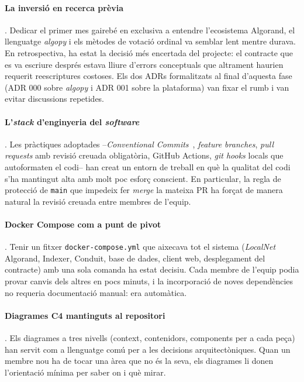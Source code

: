 \paragraph{La inversió en recerca prèvia}.
Dedicar el primer mes gairebé en exclusiva a entendre l'ecosistema Algorand, el llenguatge \emph{algopy} i els mètodes
de votació ordinal va semblar lent mentre durava.
En retrospectiva, ha estat la decisió més encertada del projecte: el contracte que es va escriure després estava lliure
d'errors conceptuals que altrament haurien requerit reescriptures costoses.
Els dos \acp{ADR} formalitzats al final d'aquesta fase (\acl{ADR} 000 sobre \emph{algopy} i \acl{ADR} 001 sobre la
plataforma) van fixar el rumb i van evitar discussions repetides.

\paragraph{L'\emph{stack} d'enginyeria del \textit{software}}.
Les pràctiques adoptades --\emph{Conventional Commits}~\cite{conventionalcommits}, \emph{feature branches},
\emph{pull requests} amb revisió creuada obligatòria, GitHub Actions, \emph{git hooks} locals que autoformaten el
codi-- han creat un entorn de treball en què la qualitat del codi s'ha mantingut alta amb molt poc esforç conscient.
En particular, la regla de protecció de \texttt{main} que impedeix fer \emph{merge} la mateixa \ac{PR} ha forçat de
manera natural la revisió creuada entre membres de l'equip.

\paragraph{Docker Compose com a punt de pivot}.
Tenir un fitxer \texttt{docker-compose.yml} que aixecava tot el sistema (\emph{LocalNet} Algorand, Indexer, Conduit,
base de dades, client web, desplegament del contracte) amb una sola comanda ha estat decisiu.
Cada membre de l'equip podia provar canvis dels altres en pocs minuts, i la incorporació de noves dependències no
requeria documentació manual: era automàtica.

\paragraph{Diagrames C4 mantinguts al repositori}.
Els diagrames a tres nivells (context, contenidors, components per a cada peça) han servit com a llenguatge comú per a
les decisions arquitectòniques.
Quan un membre nou ha de tocar una àrea que no és la seva, els diagrames li donen l'orientació mínima per saber on i què
mirar.

